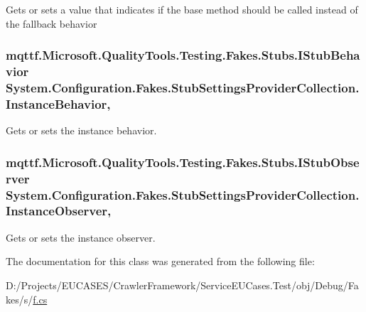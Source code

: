Gets or sets a value that indicates if the base method should be called instead of the fallback behavior

\hypertarget{class_system_1_1_configuration_1_1_fakes_1_1_stub_settings_provider_collection_a74ee3eedc2112bd6ec9b21f3c851beb2}{
\subsubsection[{Instance\-Behavior}]{\setlength{\rightskip}{0pt plus 5cm}mqttf.\-Microsoft.\-Quality\-Tools.\-Testing.\-Fakes.\-Stubs.\-I\-Stub\-Behavior System.\-Configuration.\-Fakes.\-Stub\-Settings\-Provider\-Collection.\-Instance\-Behavior\hspace{0.3cm}{\ttfamily [get]}, {\ttfamily [set]}}}\label{class_system_1_1_configuration_1_1_fakes_1_1_stub_settings_provider_collection_a74ee3eedc2112bd6ec9b21f3c851beb2}


Gets or sets the instance behavior.

\hypertarget{class_system_1_1_configuration_1_1_fakes_1_1_stub_settings_provider_collection_aa120f1e32732fb89ddda2e1c7ffdfe0a}{
\subsubsection[{Instance\-Observer}]{\setlength{\rightskip}{0pt plus 5cm}mqttf.\-Microsoft.\-Quality\-Tools.\-Testing.\-Fakes.\-Stubs.\-I\-Stub\-Observer System.\-Configuration.\-Fakes.\-Stub\-Settings\-Provider\-Collection.\-Instance\-Observer\hspace{0.3cm}{\ttfamily [get]}, {\ttfamily [set]}}}\label{class_system_1_1_configuration_1_1_fakes_1_1_stub_settings_provider_collection_aa120f1e32732fb89ddda2e1c7ffdfe0a}


Gets or sets the instance observer.



The documentation for this class was generated from the following file\-:\begin{DoxyCompactItemize}
\item 
D\-:/\-Projects/\-E\-U\-C\-A\-S\-E\-S/\-Crawler\-Framework/\-Service\-E\-U\-Cases.\-Test/obj/\-Debug/\-Fakes/s/\hyperlink{s_2f_8cs}{f.\-cs}\end{DoxyCompactItemize}
